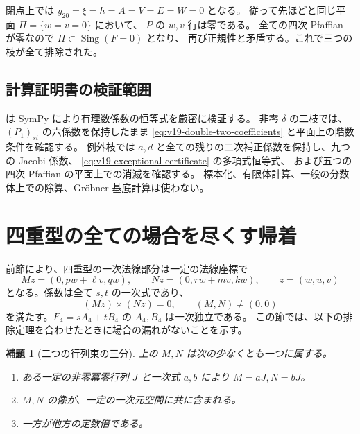 \documentclass[11pt,a4paper]{ltjsarticle}
\newtheorem{lemma}[theorem]{補題}
\theoremstyle{remark}\newtheorem{remark}[theorem]{注意}
\begin{document}
閉点上では $y_{20}=\xi=h=A=V=E=W=0$ となる。
従って先ほどと同じ平面 $\Pi=\{w=v=0\}$ において、
$P$ の $w,v$ 行は零である。
全ての四次 Pfaffian が零なので $\Pi\subset\operatorname{Sing}(F=0)$ となり、
再び正規性と矛盾する。これで三つの枝が全て排除された。

\subsection{計算証明書の検証範囲}

 は SymPy により有理数係数の恒等式を厳密に検証する。
非零 $\delta$ の二枝では、$(P_1)_{st}$ の六係数を保持したまま
\eqref{eq:v19-double-two-coefficients} と平面上の階数条件を確認する。
例外枝では $a,d$ と全ての残りの二次補正係数を保持し、九つの Jacobi 係数、
\eqref{eq:v19-exceptional-certificate} の多項式恒等式、
および五つの四次 Pfaffian の平面上での消滅を確認する。
標本化、有限体計算、一般の分数体上での除算、Gr\"obner 基底計算は使わない。


\section{四重型の全ての場合を尽くす帰着}
\label{sec:v19-m4-exhaustion}

前節により、四重型の一次法線部分は一定の法線座標で
\[
 Mz=(0,pw+\ell v,qw),\qquad
 Nz=(0,rw+mv,kw),\qquad z=(w,u,v)
\]
となる。係数は全て $s,t$ の一次式であり、
\[
              (Mz)\times(Nz)=0,\qquad(M,N)\ne(0,0)
\]
を満たす。$F_4=sA_4+tB_4$ の $A_4,B_4$ は一次独立である。
この節では、以下の排除定理を合わせたときに場合の漏れがないことを示す。

\begin{lemma}[二つの行列束の三分]\label{lem:v19-three-types}
上の $M,N$ は次の少なくとも一つに属する。
\begin{enumerate}
\item ある一定の非零冪零行列 $J$ と一次式 $a,b$ により $M=aJ,N=bJ$。
\item $M,N$ の像が、一定の一次元空間に共に含まれる。
\item 一方が他方の定数倍である。
\end{enumerate}
\end{lemma}
\end{document}
